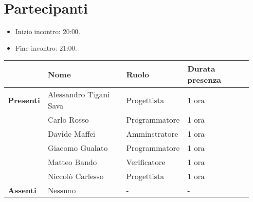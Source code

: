 \section*{Partecipanti}

\begin{itemize}
	\item Inizio incontro: 20:00.
	\item Fine incontro: 21:00.
\end{itemize}


\begin{center}
	\begin{tabular}{llll}
		                  & \textbf{Nome}          & \textbf{Ruolo} & \textbf{Durata presenza} \\
		\hline
		\textbf{Presenti} & Alessandro Tigani Sava & Progettista	& 1 ora              \\
		                  & Carlo Rosso            & Programmatore  & 1 ora              \\
		                  & Davide Maffei          & Amminstratore  & 1 ora              \\
		                  & Giacomo Gualato        & Programmatore	& 1 ora              \\
		                  & Matteo Bando           & Verificatore   & 1 ora              \\
		                  & Niccolò Carlesso       & Progettista    & 1 ora              \\
		\hline
		\textbf{Assenti}  & Nessuno                & -              & -                        \\
	\end{tabular}
\end{center}
